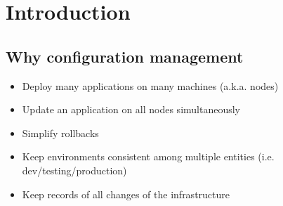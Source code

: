 \section{Introduction}

\subsection{Why configuration management}

	\begin{itemize}
		\item Deploy many applications on many machines (a.k.a. nodes)
		\item Update an application on all nodes simultaneously
		\item Simplify rollbacks
		\item Keep environments consistent among multiple entities (i.e. dev/testing/production)
		\item Keep records of all changes of the infrastructure
	\end{itemize}
